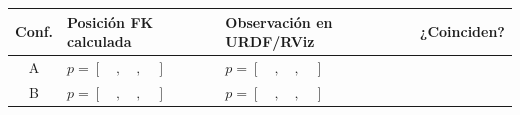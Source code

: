 \documentclass[11pt, a4paper]{article}
\begin{document}
\begin{center}
    \begin{tabularx}{\textwidth}{|c|X|X|c|}
    \hline
    \textbf{Conf.} & \textbf{Posición FK calculada} & \textbf{Observación en URDF/RViz} & \textbf{¿Coinciden?} \\ \hline
    A & $p = [ \quad, \quad, \quad ]$ & $p = [ \quad, \quad, \quad ]$ & \\ \hline
    B & $p = [ \quad, \quad, \quad ]$ & $p = [ \quad, \quad, \quad ]$ & \\ \hline
    \end{tabularx}
\end{center}
\end{document}
